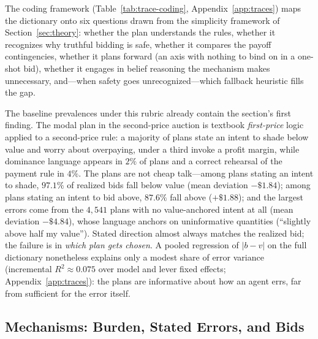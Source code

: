 The coding framework (Table~\ref{tab:trace-coding}, Appendix~\ref{app:traces}) maps the dictionary onto six questions drawn from the simplicity framework of Section~\ref{sec:theory}: whether the plan understands the rules, whether it recognizes why truthful bidding is safe, whether it compares the payoff contingencies, whether it plans forward (an axis with nothing to bind on in a one-shot bid), whether it engages in belief reasoning the mechanism makes unnecessary, and---when safety goes unrecognized---which fallback heuristic fills the gap.

The baseline prevalences under this rubric already contain the section's first finding. The modal plan in the second-price auction is textbook \emph{first-price} logic applied to a second-price rule: a majority of plans state an intent to shade below value and worry about overpaying, under a third invoke a profit margin, while dominance language appears in $2\%$ of plans and a correct rehearsal of the payment rule in $4\%$. The plans are not cheap talk---among plans stating an intent to shade, $97.1\%$ of realized bids fall below value (mean deviation $-\$1.84$); among plans stating an intent to bid above, $87.6\%$ fall above ($+\$1.88$); and the largest errors come from the $4{,}541$ plans with no value-anchored intent at all (mean deviation $-\$4.84$), whose language anchors on uninformative quantities (``slightly above half my value''). Stated direction almost always matches the realized bid; the failure is in \emph{which plan gets chosen}. A pooled regression of $|b-v|$ on the full dictionary nonetheless explains only a modest share of error variance (incremental $R^2 \approx 0.075$ over model and lever fixed effects; Appendix~\ref{app:traces}): the plans are informative about how an agent errs, far from sufficient for the error itself.

\subsection{Mechanisms: Burden, Stated Errors, and Bids}\label{sec:traces-mechanisms}

